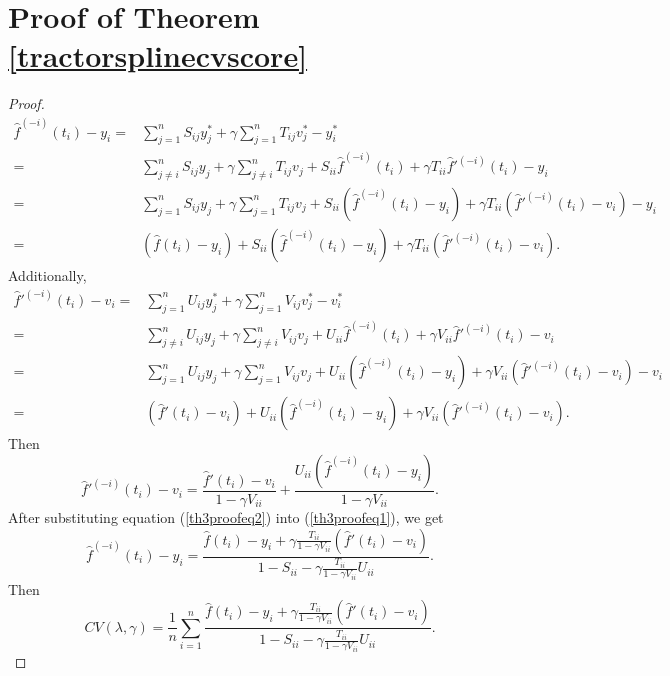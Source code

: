 \section{Proof of Theorem \ref{tractorsplinecvscore}}

\begin{proof}
\begin{equation}\label{th3proofeq1}
\begin{split}
\hat{f}^{(-i)}(t_i)-y_i=& \sum_{j=1}^{n}S_{ij}y_j^*+ \gamma \sum_{j=1}^{n}T_{ij}v_j^*-y_i^*\\
=&\sum_{j\neq i}^{n}S_{ij}y_j+ \gamma \sum_{j\neq i}^{n}T_{ij}v_j+S_{ii}\hat{f}^{(-i)}(t_i)+\gamma T_{ii}\hat{f}'^{(-i)}(t_i)-y_i\\
=&\sum_{j=1}^{n}S_{ij}y_j+ \gamma \sum_{j=1}^{n}T_{ij}v_j+S_{ii}(\hat{f}^{(-i)}(t_i)-y_i)+\gamma T_{ii}(\hat{f}'^{(-i)}(t_i)-v_i)-y_i\\
=&(\hat{f}(t_i)-y_i)+S_{ii}(\hat{f}^{(-i)}(t_i)-y_i)+\gamma T_{ii}(\hat{f}'^{(-i)}(t_i)-v_i).
\end{split}
\end{equation}
Additionally, 
\begin{equation}
\begin{split}
\hat{f}'^{(-i)}(t_i)-v_i=& \sum_{j=1}^{n}U_{ij}y_j^*+ \gamma \sum_{j=1}^{n}V_{ij}v_j^*-v_i^*\\
=&\sum_{j\neq i}^{n}U_{ij}y_j+ \gamma \sum_{j\neq i}^{n}V_{ij}v_j+U_{ii}\hat{f}^{(-i)}(t_i)+\gamma V_{ii}\hat{f}'^{(-i)}(t_i)-v_i\\
=&\sum_{j=1}^{n}U_{ij}y_j+ \gamma \sum_{j=1}^{n}V_{ij}v_j+U_{ii}(\hat{f}^{(-i)}(t_i)-y_i)+\gamma V_{ii}(\hat{f}'^{(-i)}(t_i)-v_i)-v_i\\
=&(\hat{f}'(t_i)-v_i)+U_{ii}(\hat{f}^{(-i)}(t_i)-y_i)+\gamma V_{ii}(\hat{f}'^{(-i)}(t_i)-v_i).
\end{split}
\end{equation}
Then
\begin{equation}\label{th3proofeq2}
\hat{f}'^{(-i)}(t_i)-v_i = \frac{\hat{f}'(t_i)-v_i}{1-\gamma V_{ii}}+ \frac{U_{ii}(\hat{f}^{(-i)}(t_i)-y_i)}{1-\gamma V_{ii}}.
\end{equation}
After substituting equation (\ref{th3proofeq2}) into (\ref{th3proofeq1}), we get
\begin{equation}
\hat{f}^{(-i)}(t_i)-y_i=\frac{\hat{f}(t_i)-y_i+\gamma \frac{T_{ii}}{1-\gamma V_{ii}}(\hat{f}'(t_i)-v_i)}{1-S_{ii}-\gamma\frac{T_{ii}}{1-\gamma V_{ii}}U_{ii}}.
\end{equation}
Then
\begin{equation}
CV(\lambda,\gamma)=\frac{1}{n}\sum_{i=1}^{n}\frac{\hat{f}(t_i)-y_i+\gamma \frac{T_{ii}}{1-\gamma V_{ii}}(\hat{f}'(t_i)-v_i)}{1-S_{ii}-\gamma\frac{T_{ii}}{1-\gamma V_{ii}}U_{ii}}.
\end{equation}
\end{proof}


